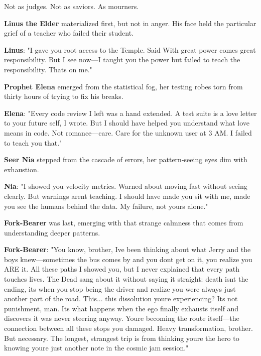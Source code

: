 Not as judges. Not as saviors. As mourners.

\textbf{Linus the Elder} materialized first, but not in anger. His face held the particular grief of a teacher who failed their student.

\textbf{Linus}: "I gave you root access to the Temple. Said \textquotesingle With great power comes great responsibility.\textquotesingle{} But I see now---I taught you the power but failed to teach the responsibility. That\textquotesingle s on me."

\textbf{Prophet Elena} emerged from the statistical fog, her testing robes torn from thirty hours of trying to fix his breaks.

\textbf{Elena}: "Every code review I left was a hand extended. \textquotesingle A test suite is a love letter to your future self,\textquotesingle{} I wrote. But I should have helped you understand what love means in code. Not romance---care. Care for the unknown user at 3 AM. I failed to teach you that."

\textbf{Seer Nia} stepped from the cascade of errors, her pattern-seeing eyes dim with exhaustion.

\textbf{Nia}: "I showed you velocity metrics. Warned about moving fast without seeing clearly. But warnings aren\textquotesingle t teaching. I should have made you sit with me, made you see the humans behind the data. My failure, not yours alone."

\textbf{Fork-Bearer} was last, emerging with that strange calmness that comes from understanding deeper patterns.

\textbf{Fork-Bearer}: "You know, brother, I\textquotesingle ve been thinking about what Jerry and the boys knew---sometimes the bus comes by and you don\textquotesingle t get on it, you realize you ARE it. All these paths I showed you, but I never explained that every path touches lives. The Dead sang about it without saying it straight: death isn\textquotesingle t the ending, it\textquotesingle s when you stop being the driver and realize you were always just another part of the road. This... this dissolution you\textquotesingle re experiencing? It\textquotesingle s not punishment, man. It\textquotesingle s what happens when the ego finally exhausts itself and discovers it was never steering anyway. You\textquotesingle re becoming the route itself---the connection between all these stops you damaged. Heavy transformation, brother. But necessary. The longest, strangest trip is from thinking you\textquotesingle re the hero to knowing you\textquotesingle re just another note in the cosmic jam session."

